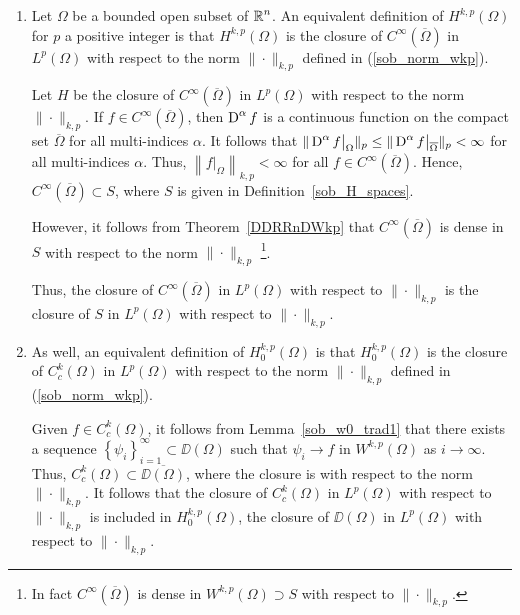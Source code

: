 \begin{rmkList} \label{sob_compl_Hk2}
\begin{enumerate}
\item Let $\Omega$ be a bounded open subset of $\displaystyle \mathbb{R}^n$.
An equivalent definition of $\displaystyle H^{k,p}(\Omega)$ for $p$ a
positive integer is that $\displaystyle H^{k,p}(\Omega)$ is the closure of
$\displaystyle C^\infty(\overline{\Omega})$ in $\displaystyle L^p(\Omega)$
with respect to the norm $\|\cdot\|_{k,p}$ defined in
(\ref{sob_norm_wkp}).

Let $H$ be the closure of $\displaystyle C^\infty(\overline{\Omega})$ in
$\displaystyle L^p(\Omega)$ with respect to the norm $\|\cdot\|_{k,p}$.
If $\displaystyle f\in C^\infty(\overline{\Omega})$, then
$\displaystyle \operatorname{D}^\alpha f$ is a
continuous function on the compact set $\overline{\Omega}$ for all
multi-indices $\alpha$.  It follows that
$\displaystyle \|\operatorname{D}^\alpha f\big|_{\Omega}\|_p \leq
\|\operatorname{D}^\alpha f\big|_{\overline{\Omega}}\|_p < \infty$ for all
multi-indices $\alpha$.  Thus,
$\displaystyle \left\|f\big|_{\Omega} \right\|_{k,p} < \infty$ for all
$\displaystyle f\in C^\infty(\overline{\Omega})$.  Hence,
$\displaystyle C^\infty(\overline{\Omega}) \subset S$, where $S$ is given in
Definition~\ref{sob_H_spaces}.

However, it follows from Theorem~\ref{DDRRnDWkp} that
$\displaystyle C^\infty(\overline{\Omega})$ is dense in $S$ with
respect to the norm $\|\cdot\|_{k,p}$ \footnote{In fact
$\displaystyle C^\infty(\overline{\Omega})$
is dense in $\displaystyle W^{k,p}(\Omega) \supset S$ with respect to
$\|\cdot\|_{k,p}$.}.

Thus, the closure of $\displaystyle C^\infty(\overline{\Omega})$ in
$\displaystyle L^p(\Omega)$ with respect to $\|\cdot\|_{k,p}$
is the closure of $S$ in $\displaystyle L^p(\Omega)$
with respect to $\|\cdot\|_{k,p}$.

\item As well, an equivalent definition of
$\displaystyle H^{k,p}_0(\Omega)$ is that
$\displaystyle H^{k,p}_0(\Omega)$ is the
closure of $\displaystyle C^k_c(\Omega)$ in $\displaystyle L^p(\Omega)$
with respect to the norm $\|\cdot\|_{k,p}$ defined in
(\ref{sob_norm_wkp}).

Given $\displaystyle f \in C^k_c(\Omega)$, it follows from
Lemma~\ref{sob_w0_trad1} that there exists a sequence
$\displaystyle \left\{ \psi_i \right\}_{i=1}^\infty \subset \DD(\Omega)$
such that $\psi_i \to f$ in $\displaystyle W^{k,p}(\Omega)$ as $i \to \infty$.
Thus, $\displaystyle C^k_c(\Omega) \subset \overline{\DD(\Omega)}$,
where the closure is with respect to the norm $\|\cdot\|_{k,p}$.
It follows that the closure of $\displaystyle C^k_c(\Omega)$ in
$\displaystyle L^p(\Omega)$ with respect to $\|\cdot\|_{k,p}$
is included in $\displaystyle H^{k,p}_0(\Omega)$, the closure of
$\DD(\Omega)$ in $\displaystyle L^p(\Omega)$
with respect to $\|\cdot\|_{k,p}$.


\end{enumerate}
\end{rmkList}
